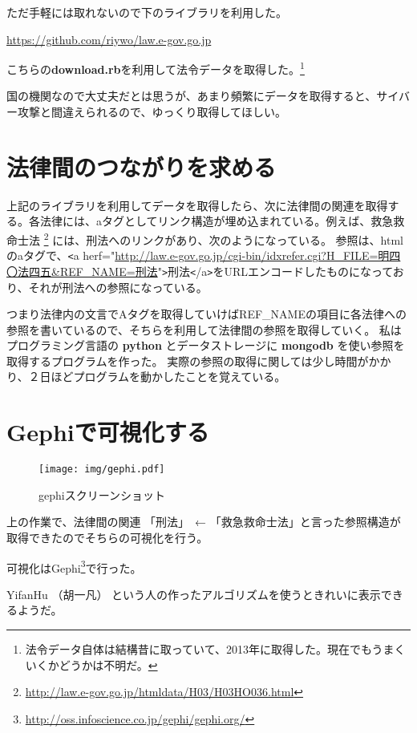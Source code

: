 \documentclass[a5j,openany,twoside]{jsbook}
\begin{document}
ただ手軽には取れないので下のライブラリを利用した。

\url{https://github.com/riywo/law.e-gov.go.jp}

こちらの\textbf{download.rb}を利用して法令データを取得した。\footnote{法令データ自体は結構昔に取っていて、2013年に取得した。現在でもうまくいくかどうかは不明だ。}

国の機関なので大丈夫だとは思うが、あまり頻繁にデータを取得すると、サイバー攻撃と間違えられるので、ゆっくり取得してほしい。

\section{法律間のつながりを求める}

上記のライブラリを利用してデータを取得したら、次に法律間の関連を取得する。各法律には、aタグとしてリンク構造が埋め込まれている。例えば、救急救命士法 \footnote{\url{http://law.e-gov.go.jp/htmldata/H03/H03HO036.html}} には、刑法へのリンクがあり、次のようになっている。
参照は、htmlのaタグで、\verb|<|a herf="\url{http://law.e-gov.go.jp/cgi-bin/idxrefer.cgi?H_FILE=明四〇法四五&REF_NAME=刑法}"\verb|>|刑法\verb|<|/a\verb|>|をURLエンコードしたものになっており、それが刑法への参照になっている。

つまり法律内の文言でAタグを取得していけばREF\_NAMEの項目に各法律への参照を書いているので、そちらを利用して法律間の参照を取得していく。
私は プログラミング言語の \textbf{python} とデータストレージに \textbf{mongodb} を使い参照を取得するプログラムを作った。
実際の参照の取得に関しては少し時間がかかり、２日ほどプログラムを動かしたことを覚えている。

\section{Gephiで可視化する}

\begin{wrapfigure}{L}{55mm}
 \begin{center}
 \texttt{[image: img/gephi.pdf]}
 \caption{gephiスクリーンショット}
 \end{center}
\end{wrapfigure}

上の作業で、法律間の関連 「刑法」　← 「救急救命士法」と言った参照構造が取得できたのでそちらの可視化を行う。

可視化はGephi\footnote{\url{http://oss.infoscience.co.jp/gephi/gephi.org/}}で行った。

YifanHu （胡一凡） という人の作ったアルゴリズムを使うときれいに表示できるようだ。
\end{document}
